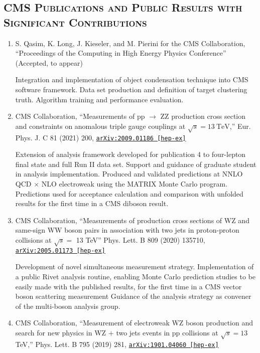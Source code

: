 \documentclass[10pt]{res} %
\begin{document}
\begin{resume}

\section{\textsc{CMS Publications and Public Results with Significant Contributions}}
\begin{enumerate}
  \item S. Qasim, K. Long, J. Kieseler, and M. Pierini for the CMS Collaboration, ``Proceedings of the Computing in High Energy Physics Conference''  (Accepted, to appear)

    Integration and implementation of object condensation technique into CMS software framework. 
    Data set production and definition of target clustering truth. Algorithm training and performance evaluation.
  \item CMS Collaboration, ``Measurements of pp $\rightarrow$ ZZ production cross section and constraints on anomalous triple gauge couplings at $\sqrt{s} = 13~\mathrm{TeV}$,'' Eur. Phys. J. C 81 (2021) 200, \href{https://arxiv.org/abs/2009.01186}{\texttt{arXiv:2009.01186 [hep-ex]}}

    Extension of analysis framework developed for publication 4 to four-lepton final state and full Run II data set.
    Support and guidance of graduate student in analysis implementation. 
    Produced and validated predictions at NNLO QCD $\times$ NLO electroweak using the MATRIX Monte Carlo program.
    Predictions used for acceptance calculation and comparison with unfolded results for the first time in a CMS diboson result. 
  \item CMS Collaboration, ``Measurements of production cross sections of WZ and same-sign WW boson pairs in association with two jets in proton-proton collisions at $\sqrt{s} =$ 13 TeV'' Phys. Lett. B 809 (2020) 135710, \href{https://arxiv.org/abs/2005.01173}{\texttt{arXiv:2005.01173 [hep-ex]}}

    Development of novel simultaneous measurement strategy. 
    Implementation of a public Rivet analysis routine, enabling Monte Carlo prediction studies to be easily made 
    with the published results, for the first time in a CMS vector boson scattering measurement
    Guidance of the analysis strategy as convener of the multi-boson analysis group.
  \item CMS Collaboration, ``Measurement of electroweak WZ boson production and search for new physics in WZ $+$ two jets events in pp collisions at $\sqrt{s}=13$\,TeV,'' Phys. Lett. B 795 (2019) 281, \href{https://arxiv.org/abs/1901.04060} {\texttt{arXiv:1901.04060 [hep-ex]}}


\end{enumerate}
\end{resume}
\end{document}
